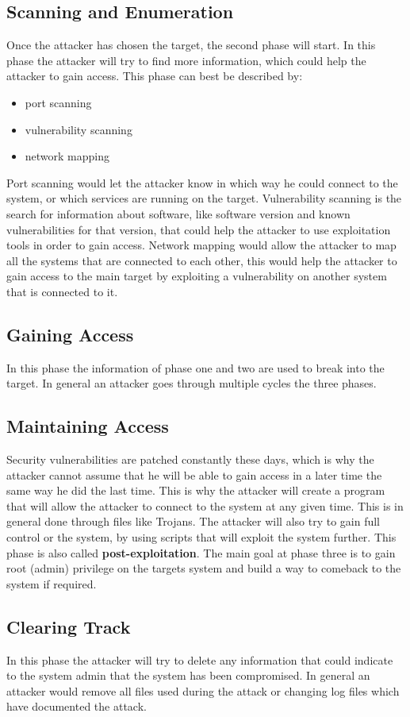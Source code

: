 \documentclass{article}%
\begin{document}
\subsection{Scanning and Enumeration}
Once the attacker has chosen the target, the second phase will start. In this phase the attacker will try to find more information, which could help the attacker to gain access. This phase can best be described by:
\begin{itemize}
	\item port scanning
	\item vulnerability scanning
	\item network mapping
\end{itemize}
Port scanning would let the attacker know in which way he could connect to the system, or which services are running on the target.
Vulnerability scanning is the search for information about software, like software version and known vulnerabilities for that version, that could help the attacker to use exploitation tools in order to gain access.
Network mapping would allow the attacker to map all the systems that are connected to each other, this would help the attacker to gain access to the main target by exploiting a vulnerability on another system that is connected to it.
\subsection{Gaining Access}
In this phase the information of phase one and two are used to break into the target. In general an attacker goes through multiple cycles the three phases.
\subsection{Maintaining Access}
Security vulnerabilities are patched constantly these days, which is why the attacker cannot assume that he will be able to gain access in a later time the same way he did the last time. This is why the attacker will create a program that will allow the attacker to connect to the system at any given time. This is in general done through files like Trojans. The attacker will also try to gain full control or the system, by using scripts that will exploit the system further. This phase is also called \textbf{post-exploitation}. The main goal at phase three is to gain root (admin) privilege on the targets system and build a way to comeback to the system if required.
\subsection{Clearing Track}
In this phase the attacker will try to delete any information that could indicate to the system admin that the system has been compromised. In general an attacker would remove all files used during the attack or changing log files which have documented the attack.
\end{document}
